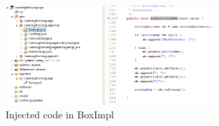     

    \begin{figure}[htbp]
        \centering
        \includegraphics[width=0.7\textwidth]{pics/injectionBilder/injected_code_in_impl.png}
        \caption{Injected code in BoxImpl}
        \label{fig:injected_code_in_boxImpl}
    \end{figure}